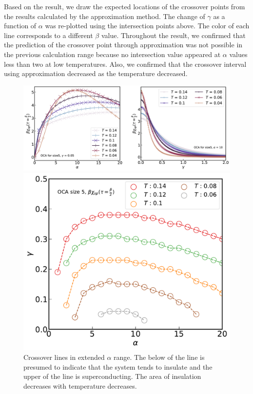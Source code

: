\documentclass{article}[12pt]
\numberwithin{equation}{section}
\begin{document}
\begin{spacing}{1.5}
Based on the result, we draw the expected locations of the crossover points from the results calculated by the approximation method. 
The change of $\gamma$ as a function of $\alpha$ was re-plotted using the intersection points above. 
The color of each line corresponds to a different $\beta$ value.
Throughout the result, we confirmed that the prediction of the crossover point through approximation was not possible 
in the previous calculation range because no intersection value appeared at $\alpha$ values less than two at low temperatures. 
Also, we confirmed that the crossover interval using approximation decreased as the temperature decreased.
\pagebreak
\begin{figure}[H]
  \vfill
  \centerline{\includegraphics[width=13cm]{TexFigure/4/4_4_04_crossing.png}}
  \centerline{\includegraphics[width=13cm]{TexFigure/4/4_4_05_templine.pdf}}
  \caption{Crossover lines in extended $\alpha$ range. The below of the line is presumed to indicate that the system tends to insulate and the upper of the line is superconducting. The area of insulation decreases with temperature decreases.}

\end{figure}
\end{spacing}
\end{document}
